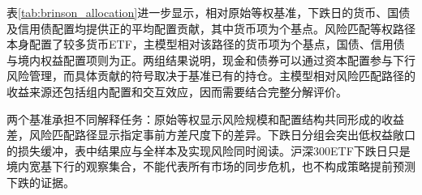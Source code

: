 表\ref{tab:brinson_allocation}进一步显示，相对原始等权基准，下跌日的货币、国债及信用债配置均提供正的平均配置贡献，其中货币项为\attrEqualCashDown{}个基点。风险匹配等权路径本身配置了较多货币ETF，主模型相对该路径的货币项为\attrMatchedCashDown{}个基点，国债、信用债与境内权益配置项则为正。两组结果说明，现金和债券可以通过资本配置参与下行风险管理，而具体贡献的符号取决于基准已有的持仓。主模型相对风险匹配路径的收益来源还包括组内配置和交互效应，因而需要结合完整分解评价。

两个基准承担不同解释任务：原始等权显示风险规模和配置结构共同形成的收益差，风险匹配路径显示指定事前方差尺度下的差异。下跌日分组会突出低权益敞口的损失缓冲，表中结果应与全样本及实现风险同时阅读。沪深300ETF下跌日只是境内宽基下行的观察集合，不能代表所有市场的同步危机，也不构成策略提前预测下跌的证据。
\FloatBarrier
